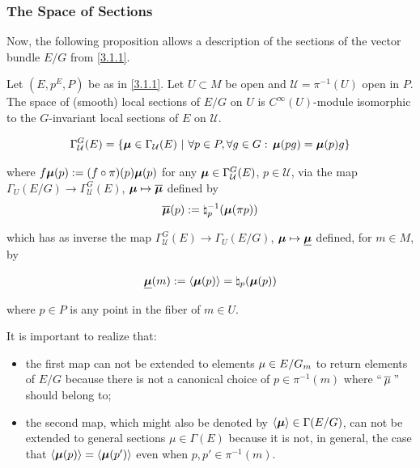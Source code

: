 \subsubsection{The Space of Sections}

Now, the following proposition allows a description of the sections of the vector bundle $E/G$ from \ref{3.1.1}.

\begin{proposition}\label{3.1.3}
Let $(E, p^E, P)$ be as in \ref{3.1.1}. Let $U \subset M$ be open and $\mathcal U = \pi^{-1}(U)$ open in $P$. The space of (smooth) local sections of $E/G$ on $U$ is $C^\infty(U)$-module isomorphic to the $G$-invariant local sections of $E$ on $\mathcal U$.

\[ 
    \Gamma_{\mathcal U}^G(E) = \left\{ \bm{\mu} \in \Gamma_{\mathcal U}(E) \ |\  \forall p \in P, \forall g \in G:\, \bm{\mu}(pg) = \bm{\mu}(p)g \right\}
\] 

where $f \bm{\mu} (p) := (f \circ \pi)(p) \bm{\mu}(p)$ for any $\bm{\mu} \in \Gamma_{\mathcal U}^G(E)$, $p \in \mathcal U$, via the map $\Gamma_U(E/G) \to \Gamma_{\mathcal U}^G(E)$, $\bm{\mathfrak{\mu}} \mapsto \overline{\bm{\mathfrak{\mu}}}$ defined by 
\[
    \overline{\bm{\mathfrak{\mu}}}(p) := \natural_p^{-1}(\bm{\mathfrak{\mu}}(\pi p))
\] %

which has as inverse the map $\Gamma_{\mathcal U}^G(E) \to \Gamma_U(E/G)$, $\bm{\mu} \mapsto \underline{\bm{\mu}}$ defined, for $m \in M$, by

\[
    \underline{\bm{\mu}}(m) := \left\langle \bm{\mu}(p) \right\rangle = \natural_p(\bm{\mu}(p))
\]

where $p \in P$ is any point in the fiber of $m \in U$.
\end{proposition}

It is important to realize that:

\begin{itemize}
    \item the first map can not be extended to elements $\mathfrak{\mu} \in E/G_m$ to return elements of $E/G$ because there is not a canonical choice of $p \in \pi^{-1}(m)$ where ``$\,\overline{\mathfrak{\mu}}\,$'' should belong to;
    
    \item the second map, which might also be denoted by $\left\langle \bm{\mu} \right\rangle \in \Gamma(E/G)$, can not be extended to general sections $\mu \in \Gamma(E)$ because it is not, in general, the case that $\left\langle \bm{\mu}(p) \right\rangle = \left\langle \bm{\mu}(p') \right\rangle$ even when $p, p' \in \pi^{-1}(m)$.
\end{itemize}

